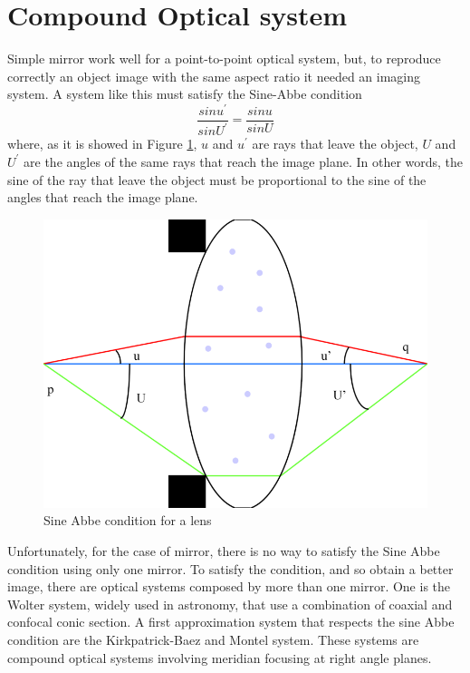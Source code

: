 \section{Compound Optical system}
Simple mirror work well for a point-to-point optical system, but, to reproduce correctly an object image with the same aspect ratio it needed an imaging system. A system like this must satisfy the Sine-Abbe condition
\begin{equation}
\frac{sin u^{'}}{sin U^{'}} = \frac{sin u}{ sin U}
\label{eq: SineAbbe}
\end{equation} 
\noindent where, as it is showed in Figure \ref{fig: SineAbbe}, $u $ and $u^{'} $ are rays that leave the object, $U$ and $U^{'} $ are the angles of the same rays that reach the image plane. In other words, the sine of the ray that leave the object must be proportional to the sine of the angles that reach the image plane.
\begin{figure}[]
%
\centering
%
\includegraphics[width=.6\textwidth]{Immagini/Chapter2/SineAbbeCondition}
%
\caption{Sine Abbe condition for a lens}
%
\label{fig: SineAbbe}
%
\end{figure}
Unfortunately, for the case of mirror, there is no way to satisfy the Sine Abbe condition using only one mirror. To satisfy the condition, and so obtain a better image, there are optical systems composed by more than one mirror. One is the Wolter system, widely used in astronomy, that use a combination of coaxial and confocal conic section. A first approximation system that respects the sine Abbe condition are the Kirkpatrick-Baez and Montel system. These systems are compound optical systems involving meridian focusing at right angle planes.
